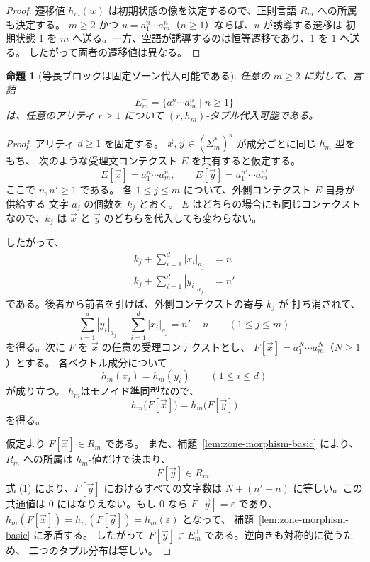 \documentclass[11pt,a4paper]{ltjsarticle}
\newtheorem{proposition}[theorem]{命題}
\theoremstyle{remark}
\newcommand{\tuple}[1]{\vec{#1}}
\newcommand{\eps}{\varepsilon}
\begin{document}
\begin{proof}
遷移値 \(h_m(w)\) は初期状態の像を決定するので、正則言語 \(R_m\) への所属も決定する。
\(m\ge2\) かつ \(u=a_1^n\cdots a_m^n\)（\(n\ge1\)）ならば、\(u\) が誘導する遷移は
初期状態 \(1\) を \(m\) へ送る。一方、空語が誘導するのは恒等遷移であり、\(1\) を \(1\) へ送る。
したがって両者の遷移値は異なる。
\end{proof}

\begin{proposition}[等長ブロックは固定ゾーン代入可能である]
\label{prop:equality-block-substitutable}
任意の \(m\ge2\) に対して、言語
\[
  E_m^+=\{a_1^n\cdots a_m^n\mid n\ge1\}
\]
は、任意のアリティ \(r\ge1\) について \((r,h_m)\)-タプル代入可能である。
\end{proposition}

\begin{proof}
アリティ \(d\ge1\) を固定する。
\(\tuple x,\tuple y\in(\Sigma_m^*)^d\) が成分ごとに同じ \(h_m\)-型をもち、
次のような受理文コンテクスト \(E\) を共有すると仮定する。
\[
  E[\tuple x]=a_1^n\cdots a_m^n,
  \qquad
  E[\tuple y]=a_1^{n'}\cdots a_m^{n'}
\]
ここで \(n,n'\ge1\) である。
各 \(1\le j\le m\) について、外側コンテクスト \(E\) 自身が供給する
文字 \(a_j\) の個数を \(k_j\) とおく。
\(E\) はどちらの場合にも同じコンテクストなので、\(k_j\) は
\(\tuple x\) と \(\tuple y\) のどちらを代入しても変わらない。

したがって、
\begin{align*}
k_j+\sum_{i=1}^{d}|x_i|_{a_j}&=n\\
k_j+\sum_{i=1}^{d}|y_i|_{a_j}&=n'
\end{align*}
である。後者から前者を引けば、外側コンテクストの寄与 \(k_j\) が
打ち消されて、
\[
  \sum_{i=1}^{d}|y_i|_{a_j}
  -
  \sum_{i=1}^{d}|x_i|_{a_j}
  =n'-n
  \qquad (1\le j\le m)
  \tag{1}
\]
を得る。次に \(F\) を \(\tuple x\) の任意の受理コンテクストとし、
\(F[\tuple x]=a_1^N\cdots a_m^N\)（\(N\ge1\)）とする。
各ベクトル成分について
\[
  h_m(x_i)=h_m(y_i)
  \qquad (1\le i\le d)
\]
が成り立つ。
$h_m$はモノイド準同型なので、
\[
  h_m\bigl(F[\tuple x]\bigr)
  =
  h_m\bigl(F[\tuple y]\bigr)
\]
を得る。

仮定より \(F[\tuple x]\in R_m\) である。
また、補題~\ref{lem:zone-morphism-basic} により、
\(R_m\) への所属は \(h_m\)-値だけで決まり、
\[
  F[\tuple y]\in R_m .
\]
式 (1) により、\(F[\tuple y]\) におけるすべての文字数は
\(N+(n'-n)\) に等しい。この共通値は 0 にはなりえない。もし 0 なら
\(F[\tuple y]=\eps\) であり、
\(h_m(F[\tuple x])=h_m(F[\tuple y])=h_m(\eps)\) となって、
補題~\ref{lem:zone-morphism-basic} に矛盾する。
したがって \(F[\tuple y]\in E_m^+\) である。逆向きも対称的に従うため、
二つのタプル分布は等しい。
\end{proof}
\end{document}
